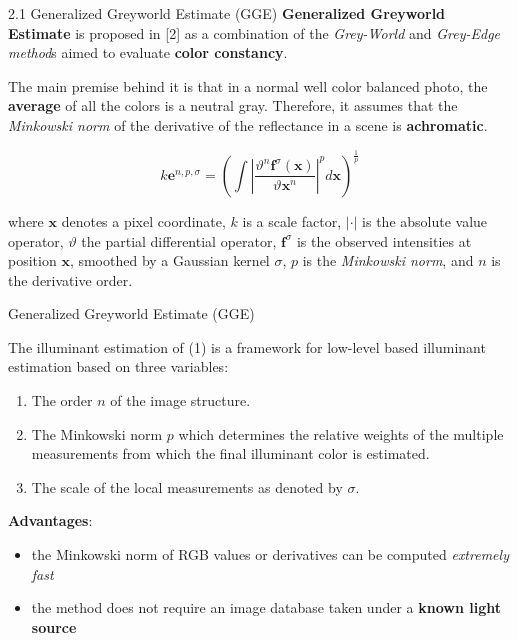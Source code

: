\begin{tframe}{2.1 Generalized Greyworld Estimate (GGE)}
\textbf{Generalized Greyworld Estimate} is proposed in [2] as a combination of the \emph{Grey-World} and \emph{Grey-Edge method}s aimed to evaluate \textbf{color constancy}.

\vspace{0.3cm}
The main premise behind it is that in a normal well color balanced photo, the \textbf{average} of all the colors is a neutral gray. Therefore, it assumes that the \emph{Minkowski norm} of the derivative of the reflectance in a scene is \textbf{achromatic}.

\begin{equation}
k\textbf{e}^{n, p, \sigma} = (\int |\frac{\vartheta^{n}\textbf{f}^{\sigma}(\textbf{x})}{\vartheta\textbf{x}^{n}}|^{p}  d\textbf{x})^{\frac{1}{p}}
\end{equation}
\begin{footnotesize}
where $\textbf{x}$ denotes a pixel coordinate, $k$ is a scale factor, $|\cdot|$ is the absolute value operator, $\vartheta$ the partial differential operator, $\textbf{f}^{\sigma}$ is the observed intensities at position $\textbf{x}$, smoothed by a Gaussian kernel $\sigma$, $p$ is the \emph{Minkowski norm}, and $n$ is the derivative order.
\end{footnotesize}
\end{tframe}

\begin{tframe}{Generalized Greyworld Estimate (GGE)}

The illuminant estimation of (1) is a framework for low-level based illuminant estimation based on three variables:
\begin{enumerate}
\item The order $n$ of the image structure.
\item The Minkowski norm $p$ which determines the relative weights of the multiple measurements from which the final illuminant color is estimated.
\item The scale of the local measurements as denoted by $\sigma$.
\end{enumerate}
\vspace{0.2cm}
\textbf{Advantages}:
\begin{itemize}
\item the Minkowski norm of RGB values or derivatives can be computed\emph{ extremely fast}
\item the method does not require an image database taken under a \textbf{known light source}
\end{itemize}

\end{tframe}



